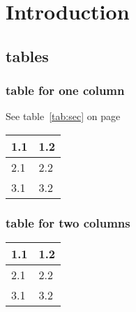 \chapter{Introduction}

\section{tables}

\subsection{table for one column}
\blindtext[3] See table~\ref{tab:sec} on page~\pageref{tab:sec}
\begin{Table}
  \begin{tabularx}{\textwidth}[htb]{X X}
    \toprule
    1.1 & 1.2 \\
    \midrule
    2.1 & 2.2 \\
    3.1 & 3.2 \\
    \bottomrule
  \end{tabularx}
  \captionsetup{type=table}
  \caption{My first table.}\label{tab:first}
\end{Table}

\subsection{table for two columns}
\blindtext{}
\begin{table*}
  \caption{My second table.}\label{tab:sec}
  \begin{tabularx}{\textwidth}{X X}
    \toprule
    1.1 & 1.2 \\
    \midrule
    2.1 & 2.2 \\
    3.1 & 3.2 \\
    \bottomrule
  \end{tabularx}
\end{table*}
\blindtext{}
